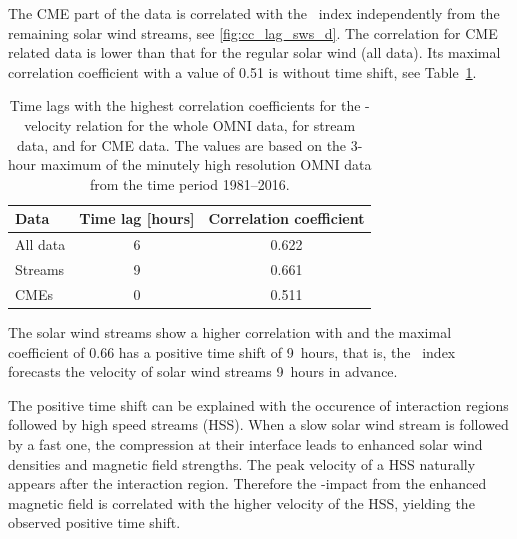 The CME part of the data is correlated with the \Kp~index independently from the remaining solar wind streams, see \autoref{fig:cc_lag_sws_d}. The correlation for CME related data is lower than that for the regular solar wind (all data). Its maximal correlation coefficient with a value of 0.51 is without time shift, see Table~\ref{tab:correlation_coefficients_kpvsv}.
\begin{table}
	\caption{Time lags with the highest correlation coefficients for the \Kp{}-velocity relation for the whole OMNI data, for stream data, and for CME data. The values are based on the 3-hour maximum of the minutely high resolution OMNI data from the time period 1981--2016.}
	\label{tab:correlation_coefficients_kpvsv}
	\centering
	\begin{tabular}{lcc}
		\hline\hline
		Data	&Time lag [hours]	&Correlation coefficient\\
		\hline
		All data	&6	&0.622\\
		Streams	&9	&0.661\\
		CMEs	&0	&0.511\\
		\hline
	\end{tabular}
\end{table}
% 
The solar wind streams show a higher correlation with \Kp{} and the maximal coefficient of 0.66 has a positive time shift of 9~hours, that is, the \Kp~index forecasts the velocity of solar wind streams 9~hours in advance.

The positive time shift can be explained with the occurence of interaction regions followed by high speed streams (HSS). When a slow solar wind stream is followed by a fast one, the compression at their interface leads to enhanced solar wind densities and magnetic field strengths. The peak velocity of a HSS naturally appears after the interaction region. Therefore the \Kp-impact from the enhanced magnetic field is correlated with the higher velocity of the HSS, yielding the observed positive time shift.


